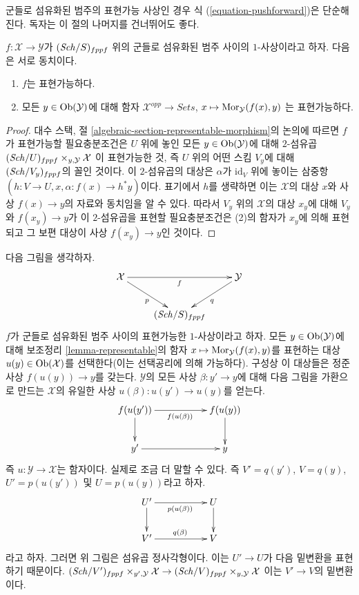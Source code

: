\noindent
군들로 섬유화된 범주의 표현가능 사상인 경우 식
(\ref{equation-pushforward})은 단순해진다. 독자는 이 절의 나머지를
건너뛰어도 좋다.

\begin{lemma}
\label{lemma-representable}
$f : \mathcal{X} \to \mathcal{Y}$가 $(\mathit{Sch}/S)_{fppf}$ 위의 군들로
섬유화된 범주 사이의 $1$-사상이라고 하자. 다음은 서로 동치이다.
\begin{enumerate}
\item $f$는 표현가능하다.
\item 모든 $y \in \mathop{\mathrm{Ob}}\nolimits(\mathcal{Y})$에 대해 함자
$\mathcal{X}^{opp} \to \textit{Sets}$,
$x \mapsto \mathop{\mathrm{Mor}}\nolimits_\mathcal{Y}(f(x), y)$
는 표현가능하다.
\end{enumerate}
\end{lemma}

\begin{proof}
대수 스택, 절 \ref{algebraic-section-representable-morphism}의
논의에 따르면 $f$가 표현가능할 필요충분조건은 $U$ 위에 놓인
모든 $y \in \mathop{\mathrm{Ob}}\nolimits(\mathcal{Y})$에 대해 $2$-섬유곱
$(\mathit{Sch}/U)_{fppf} \times_{y, \mathcal{Y}} \mathcal{X}$
이 표현가능한 것, 즉 $U$ 위의 어떤 스킴 $V_y$에 대해
$(\mathit{Sch}/V_y)_{fppf}$의 꼴인 것이다. 이 $2$-섬유곱의 대상은
$\alpha$가 $\text{id}_V$ 위에 놓이는 삼중항
$(h : V \to U, x, \alpha : f(x) \to h^*y)$이다. 표기에서 $h$를
생략하면 이는 $\mathcal{X}$의 대상 $x$와 사상 $f(x) \to y$의
자료와 동치임을 알 수 있다. 따라서 $V_y$ 위의 $\mathcal{X}$의
대상 $x_y$에 대해 $V_y$와 $f(x_y) \to y$가 이 $2$-섬유곱을
표현할 필요충분조건은 (2)의 함자가 $x_y$에 의해 표현되고
그 보편 대상이 사상 $f(x_y) \to y$인 것이다.
\end{proof}

\noindent
다음 그림을 생각하자.
$$
\xymatrix{
\mathcal{X} \ar[rr]_f \ar[rd]_p & &  \mathcal{Y} \ar[ld]^q \\
& (\Sch/S)_{fppf}
}
$$
$f$가 군들로 섬유화된 범주 사이의 표현가능한 $1$-사상이라고 하자.
모든 $y \in \mathop{\mathrm{Ob}}\nolimits(\mathcal{Y})$에 대해 보조정리
\ref{lemma-representable}의 함자
$x \mapsto \mathop{\mathrm{Mor}}\nolimits_\mathcal{Y}(f(x), y)$를 표현하는 대상
$u(y) \in \mathop{\mathrm{Ob}}\nolimits(\mathcal{X})$를 선택한다(이는 선택공리에 의해 가능하다).
구성상 이 대상들은 정준 사상 $f(u(y)) \to y$를 갖는다.
$\mathcal{Y}$의 모든 사상 $\beta : y' \to y$에 대해 다음 그림을
가환으로 만드는 $\mathcal{X}$의 유일한 사상
$u(\beta) : u(y') \to u(y)$를 얻는다.
$$
\xymatrix{
f(u(y')) \ar[d] \ar[rr]_{f(u(\beta))} & & f(u(y)) \ar[d] \\
y' \ar[rr] & & y
}
$$
즉 $u : \mathcal{Y} \to \mathcal{X}$는 함자이다.
실제로 조금 더 말할 수 있다. 즉
$V' = q(y')$, $V = q(y)$, $U' = p(u(y'))$ 및 $U = p(u(y))$라고 하자.
$$
\xymatrix{
U' \ar[rr]_{p(u(\beta))} \ar[d] & & U \ar[d] \\
V' \ar[rr]^{q(\beta)} & & V
}
$$
라고 하자. 그러면 위 그림은 섬유곱 정사각형이다. 이는 $U' \to U$가
다음 밑변환을 표현하기 때문이다.
$(\mathit{Sch}/V')_{fppf} \times_{y', \mathcal{Y}} \mathcal{X} \to
(\mathit{Sch}/V)_{fppf} \times_{y, \mathcal{Y}} \mathcal{X}$
이는 $V' \to V$의 밑변환이다.

